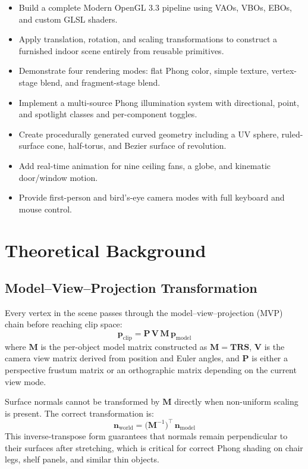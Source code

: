\documentclass[12pt, a4paper]{article}
\begin{document}
\begin{itemize}[leftmargin=1.5em]
    \item Build a complete Modern OpenGL 3.3 pipeline using VAOs, VBOs, EBOs, and custom GLSL shaders.
    \item Apply translation, rotation, and scaling transformations to construct a furnished indoor scene entirely from reusable primitives.
    \item Demonstrate four rendering modes: flat Phong color, simple texture, vertex-stage blend, and fragment-stage blend.
    \item Implement a multi-source Phong illumination system with directional, point, and spotlight classes and per-component toggles.
    \item Create procedurally generated curved geometry including a UV sphere, ruled-surface cone, half-torus, and Bezier surface of revolution.
    \item Add real-time animation for nine ceiling fans, a globe, and kinematic door/window motion.
    \item Provide first-person and bird's-eye camera modes with full keyboard and mouse control.
\end{itemize}

\section{Theoretical Background}

\subsection{Model--View--Projection Transformation}

Every vertex in the scene passes through the model--view--projection (MVP) chain before reaching clip space:
\begin{equation}
    \mathbf{p}_{\text{clip}} = \mathbf{P}\,\mathbf{V}\,\mathbf{M}\,\mathbf{p}_{\text{model}}
    \label{eq:mvp}
\end{equation}
where $\mathbf{M}$ is the per-object model matrix constructed as $\mathbf{M}=\mathbf{T}\mathbf{R}\mathbf{S}$, $\mathbf{V}$ is the camera view matrix derived from position and Euler angles, and $\mathbf{P}$ is either a perspective frustum matrix or an orthographic matrix depending on the current view mode.

Surface normals cannot be transformed by $\mathbf{M}$ directly when non-uniform scaling is present. The correct transformation is:
\begin{equation}
    \mathbf{n}_{\text{world}} = \bigl(\mathbf{M}^{-1}\bigr)^{\!\top}\,\mathbf{n}_{\text{model}}
    \label{eq:normal}
\end{equation}
This inverse-transpose form guarantees that normals remain perpendicular to their surfaces after stretching, which is critical for correct Phong shading on chair legs, shelf panels, and similar thin objects.
\end{document}
